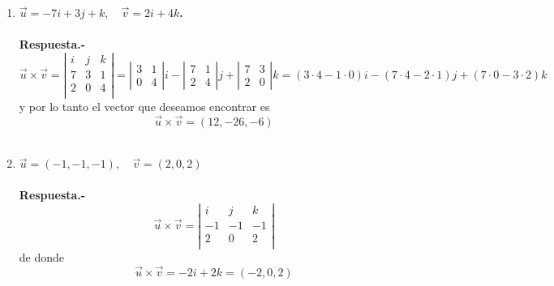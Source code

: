 \begin{enumerate}
\begin{enumerate}[\bfseries a)]
    \item \textbf{\boldmath $\vec{u}=-7i+3j+k, \quad \vec{v}=2i+4k$.\\\\
	Respuesta.-}\;
	$$\vec{u}\times \vec{v} = \left|\begin{array}{ccc}
	    i&j&k\\
	    7&3&1\\
	    2&0&4\\
	\end{array}\right|=\left|\begin{array}{cc}3&1\\ 0&4 \end{array}\right|i - \left|\begin{array}{cc} 7&1\\2&4 \end{array}\right|j + \left|\begin{array}{cc} 7&3\\2&0 \end{array}\right|k=(3\cdot 4 - 1\cdot 0)i - (7\cdot 4-2\cdot 1)j+(7\cdot 0 - 3\cdot 2)k$$
	y por lo tanto el vector que deseamos encontrar es $$\vec{u}\times \vec{v}=(12,-26,-6)$$\\

    \item \textbf{\boldmath $\vec{u}=(-1,-1,-1), \quad \vec{v}=(2,0,2)$\\\\
	Respuesta.-}\;
	$$\vec{u}\times \vec{v} = \left|\begin{array}{rrr}
	    i&j&k\\
	    -1&-1&-1\\
	    2&0&2\\
	\end{array}\right|$$
	de donde $$\vec{u}\times \vec{v} = -2i +2k = (-2,0,2)$$\\

\end{enumerate}


\end{enumerate}
